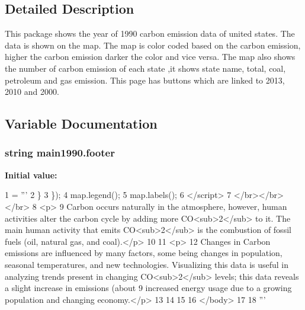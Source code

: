 \subsection{Detailed Description}
\begin{DoxyVerb}This package shows the year of 1990 carbon emission data of united states. The data is shown on the map. The map is color
coded based on the carbon emission, higher the carbon emission darker the color and vice versa. The map also shows the number 
of carbon emission of each state ,it shows  state name, total, coal, petroleum and gas emission. This page has buttons which
are linked to 2013, 2010 and 2000.
\end{DoxyVerb}
 

\subsection{Variable Documentation}
\subsubsection[{\texorpdfstring{footer}{footer}}]{\setlength{\rightskip}{0pt plus 5cm}string main1990.\+footer}\hypertarget{namespacemain1990_a5e7452a7dda32dc21dabd42a638b5483}{}\label{namespacemain1990_a5e7452a7dda32dc21dabd42a638b5483}
{\bfseries Initial value\+:}
\begin{DoxyCode}
1 = \textcolor{stringliteral}{'''}
2 \textcolor{stringliteral}{      \}}
3 \textcolor{stringliteral}{    \});}
4 \textcolor{stringliteral}{map.legend();}
5 \textcolor{stringliteral}{map.labels();}
6 \textcolor{stringliteral}{    </script>}
7 \textcolor{stringliteral}{</br></br></br>}
8 \textcolor{stringliteral}{<p>}
9 \textcolor{stringliteral}{   Carbon occurs naturally in the atmosphere, however, human activities alter the carbon cycle by adding
       more CO<sub>2</sub> to it. The main human activity that emits CO<sub>2</sub> is the combustion of fossil fuels
       (oil, natural gas, and coal).</p>}
10 \textcolor{stringliteral}{}
11 \textcolor{stringliteral}{<p>}
12 \textcolor{stringliteral}{Changes in Carbon emissions are influenced by many factors, some being changes in population, seasonal
       temperatures, and new technologies. Visualizing this data is useful in analyzing trends present in changing
       CO<sub>2</sub> levels; this data reveals a slight increase in emissions (about 9%
       increased energy usage due to a growing population and changing economy.</p>}
13 \textcolor{stringliteral}{}
14 \textcolor{stringliteral}{}
15 \textcolor{stringliteral}{}
16 \textcolor{stringliteral}{</body>}
17 \textcolor{stringliteral}{}
18 \textcolor{stringliteral}{'''}
\end{DoxyCode}
